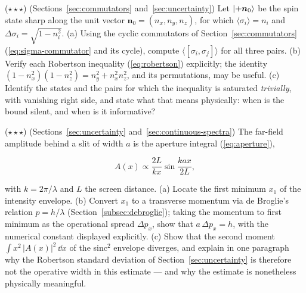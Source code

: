 \begin{problemset}
\item ($\star\star\star$) (Sections~\ref{sec:commutators} and~\ref{sec:uncertainty}) Let $\ket{+\bm n_0}$ be the spin state sharp along the unit vector $\bm n_0 = (n_x,n_y,n_z)$, for which $\langle\sigma_i\rangle = n_i$ and $\Delta\sigma_i = \sqrt{1-n_i^2}$. (a) Using the cyclic commutators of Section~\ref{sec:commutators} (\eqref{eq:sigma-commutator} and its cycle), compute $\langle[\sigma_i,\sigma_j]\rangle$ for all three pairs. (b) Verify each Robertson inequality (\eqref{eq:robertson}) explicitly; the identity $(1-n_x^2)(1-n_z^2) = n_y^2 + n_x^2 n_z^2$, and its permutations, may be useful. (c) Identify the states and the pairs for which the inequality is saturated \emph{trivially}, with vanishing right side, and state what that means physically: when is the bound silent, and when is it informative?

\item ($\star\star\star$) (Sections~\ref{sec:uncertainty} and~\ref{sec:continuous-spectra}) The far-field amplitude behind a slit of width $a$ is the aperture integral (\eqref{eq:aperture}),
\begin{linenomath}
    \begin{equation}
        A(x) \propto \frac{2L}{kx}\sin\frac{kax}{2L} ,
    \end{equation}
\end{linenomath}
with $k = 2\pi/\lambda$ and $L$ the screen distance. (a) Locate the first minimum $x_1$ of the intensity envelope. (b) Convert $x_1$ to a transverse momentum via de Broglie's relation $p = h/\lambda$ (Section~\ref{subsec:debroglie}); taking the momentum to first minimum as the operational spread $\Delta p_x$, show that $a\,\Delta p_x = h$, with the numerical constant displayed explicitly. (c) Show that the second moment $\int x^2\,|A(x)|^2\,\dd x$ of the sinc$^2$ envelope diverges, and explain in one paragraph why the Robertson standard deviation of Section~\ref{sec:uncertainty} is therefore not the operative width in this estimate --- and why the estimate is nonetheless physically meaningful.
\end{problemset}

